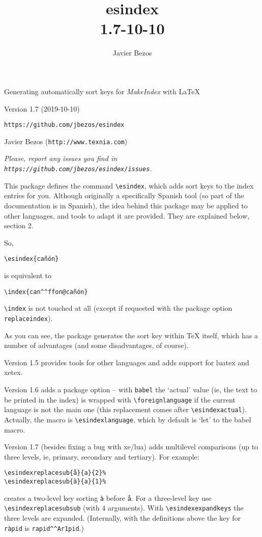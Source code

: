 \documentclass[a4paper]{ltxguide}
\title{\textsf{esindex}\\\large 1.7\quad 2019-10-10}
\author{Javier Bezos}
\begin{document}
\vspace*{1cm}
{\fontsize{48}{48}\selectfont \color{notes}{esindex}\par}
{\LARGE Generating automatically sort keys for \textit{MakeIndex}
with \LaTeX\par}
\vspace*{1ex}
Version 1.7 (2019-10-10)\par
\texttt{https://github.com/jbezos/esindex}\par
Javier Bezos (\texttt{http://www.texnia.com})

\vspace*{6ex}

{\small\itshape Please, report any issues you find in
  \texttt{https://github.com/jbezos/esindex/issues}.\par}

This package defines the command \verb|\esindex|, which adds sort keys
to the index entries for you. Although originally a specifically Spanish
tool (so part of the documentation is in Spanish), the idea behind this
package may be applied to other languages, and tools to adapt it are
provided. They are explained below, section 2.

So,
\begin{verbatim}
\esindex{cañón}
\end{verbatim}
is equivalent to
\begin{verbatim}
\index{can^^ffon@cañón}
\end{verbatim}

\verb|\index| is not touched at all (except if requested with the package
option \verb|replaceindex|).

As you can see, the package generates the sort key within \TeX{}
itself, which has a number of advantages (and some disadvantages, of
course).

Version 1.5 provides tools for other languages and adds support for
\textsf{luatex} and \textsf{xetex}.

Version 1.6 adds a package option -- with \verb|babel| the `actual' value
(ie, the text to be printed in the index) is wrapped with
\verb|\foreignlanguage| if the current language is not the main one
(this replacement comes after \verb|\esindexactual|). Actually, the
macro is \verb|\esindexlanguage|, which by default is `let' to the
\textsf{babel} macro.

Version 1.7 (besides fixing a bug with xe/lua) adds multilevel
comparisons (up to three levels, ie, primary, secondary and tertiary).
For example:
\begin{verbatim}
\esindexreplacesub{å}{a}{2}%
\esindexreplacesub{à}{a}{1}%
\end{verbatim}
creates a two-level key sorting \verb|à| before \verb|å|. For a
three-level key use \verb|\esindexreplacesubsub| (with 4 arguments). With
\verb|\esindexexpandkeys| the three levels are expanded. (Internally,
with the definitions above the key for \verb|ràpid| is
\verb|rapid^^Ar1pid|.)
\end{document}
